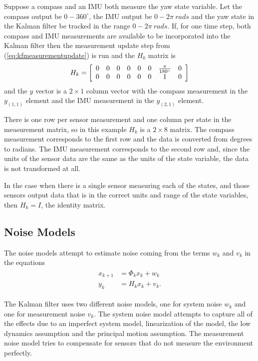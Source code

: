 Suppose a compass and an IMU both measure the yaw state variable. Let the compass output be $0 - 360^\circ$, the IMU output be $0 - 2\pi~rads$ and the yaw state in the Kalman filter be tracked in the range $0 - 2\pi ~ rads$. If, for one time step, both compass and IMU measurements are available to be incorporated into the Kalman filter then the measurement update step from (\ref{eq:kfmeasurementupdate}) is run and the $H_k$ matrix is
\begin{align*}
H_k = \left[\begin{array}{c c c c c c c c}
0 & 0 & 0 & 0 & 0 & 0 & \frac{\pi}{180^\circ} & 0 \\
0 & 0 & 0 & 0 & 0 & 0 & 1 & 0
\end{array}\right]
\end{align*}
and the $y$ vector is a $2\times1$ column vector with the compass measurement in the $y_{(1,1)}$ element and the IMU measurement in the $y_{(2,1)}$ element.

There is one row per sensor measurement and one column per state in the measurement matrix, so in this example $H_k$ is a $2\times8$ matrix. The compass measurement corresponds to the first row and the data is converted from degrees to radians. The IMU measurement corresponds to the second row and, since the units of the sensor data are the same as the units of the state variable, the data is not transformed at all.

In the case when there is a single sensor measuring each of the states, and those sensors output data that is in the correct units and range of the state variables, then $H_k=I$, the identity matrix.

\subsection{Noise Models}
\label{sec:kfNoiseModels}
The noise models attempt to estimate noise coming from the terms $w_k$ and $v_k$ in the equations
\begin{align*}
\begin{split}
x_{k+1} &= \Phi_kx_k + w_k \\
y_k &= H_kx_k + v_k.
\end{split}
\end{align*}

The Kalman filter uses two different noise models, one for system noise $w_k$ and one for measurement noise $v_k$. The system noise model attempts to capture all of the effects due to an imperfect system model, linearization of the model, the low dynamics assumption and the principal motion assumption. The measurement noise model tries to compensate for sensors that do not measure the environment perfectly.

